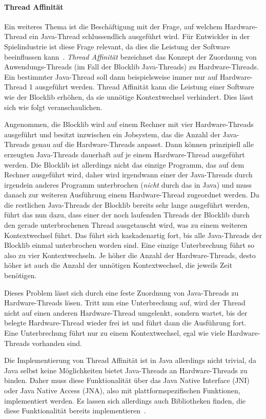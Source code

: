 \paragraph{Thread Affinität}
Ein weiteres Thema ist die Beschäftigung mit der Frage, auf welchem Hardware-Thread ein Java-Thread schlussendlich ausgeführt wird. Für Entwickler in der Spielindustrie ist diese Frage relevant, da dies die Leistung der Software beeinflussen kann~\cite{Gyrling2015}. \emph{Thread Affinität} bezeichnet das Konzept der Zuordnung von Anwendungs-Threads (im Fall der Blocklib Java-Threads) zu Hardware-Threads. Ein bestimmter Java-Thread soll dann beispielsweise immer nur auf Hardware-Thread 1 ausgeführt werden. Thread Affinität kann die Leistung einer Software wie der Blocklib erhöhen, da sie unnötige Kontextwechsel verhindert. Dies lässt sich wie folgt veranschaulichen.

Angenommen, die Blocklib wird auf einem Rechner mit vier Hardware-Threads ausgeführt und besitzt inzwischen ein Jobsystem, das die Anzahl der Java-Threads genau auf die Hardware-Threads anpasst. Dann können prinzipiell alle erzeugten Java-Threads dauerhaft auf je einem Hardware-Thread ausgeführt werden. Die Blocklib ist allerdings nicht das einzige Programm, das auf dem Rechner ausgeführt wird, daher wird irgendwann einer der Java-Threads durch irgendein anderes Programm unterbrochen (\emph{nicht} durch das  in Java) und muss danach zur weiteren Ausführung einem Hardware-Thread zugeordnet werden. Da die restlichen Java-Threads der Blocklib bereits sehr lange ausgeführt werden, führt das nun dazu, dass einer der noch laufenden Threads der Blocklib durch den gerade unterbrochenen Thread ausgetauscht wird, was zu einem weiteren Kontextwechsel führt. Das führt sich kaskadenartig fort, bis alle Java-Threads der Blocklib einmal unterbrochen worden sind. Eine einzige Unterbrechung führt so also zu vier Kontextwechseln. Je höher die Anzahl der Hardware-Threads, desto höher ist auch die Anzahl der unnötigen Kontextwechsel, die jeweils Zeit benötigen.

Dieses Problem lässt sich durch eine feste Zuordnung von Java-Threads zu Hardware-Threads lösen. Tritt nun eine Unterbrechung auf, wird der Thread nicht auf einen anderen Hardware-Thread umgelenkt, sondern wartet, bis der belegte Hardware-Thread wieder frei ist und führt dann die Ausführung fort. Eine Unterbrechung führt nur zu einem Kontextwechsel, egal wie viele Hardware-Threads vorhanden sind.

Die Implementierung von Thread Affinität ist in Java allerdings nicht trivial, da Java selbst keine Möglichkeiten bietet Java-Threads an Hardware-Threads zu binden. Daher muss diese Funktionalität über das Java Native Interface (JNI) oder Java Native Access (JNA), also mit plattformspezifischen Funktionen, implementiert werden. Es lassen sich allerdings auch Bibliotheken finden, die diese Funktionalität bereits implementieren~\cite{ChronicleSoftware,Cheremin2011}.